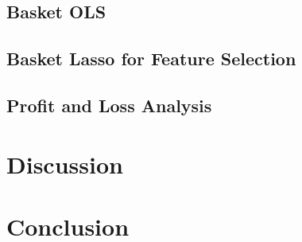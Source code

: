 \documentclass{article}
\begin{document}
\subsection{Basket OLS}
\subsection{Basket Lasso for Feature Selection}
\subsection{Profit and Loss Analysis}

\section{Discussion}

\section{Conclusion}
\end{document}
